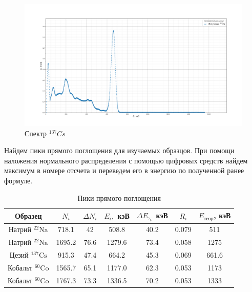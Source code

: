 \documentclass[a4paper,12pt]{article} %
\begin{document}
	\begin{figure}[H]
		\centering
		\includegraphics[width=0.95\linewidth]{Cs_137}
		\caption{Спектр $^{137}Cs$}
		\label{fig:cs137}
	\end{figure}
	Найдем пики прямого поглощения для изучаемых образцов. При помощи наложения нормального распределения с помощью цифровых средств найдем максимум в номере отсчета и переведем его в энергию по полученной ранее формуле.
	\begin{table}[H]
		\caption{Пики прямого поглощения}
		\begin{center}
			\begin{tabular}{|c|c|c|c|c|c|c|}
				\hline 
				Образец & $N_i $ & $ \Delta N_i $ & $ E_i, $ кэВ & $ \Delta E,_i $ кэВ  & $ R_i $ & $E_{\text{теор}}$, кэВ\\ 
				\hline 
				Натрий $ \mathrm{^{22}Na} $ & 718.1 & 42 & 508.8 & 40.2 & 0.079 & 511\\
				Натрий $ \mathrm{^{22}Na} $& 1695.2 & 76.6 & 1279.6 & 73.4 & 0.058 & 1275 \\
				Цезий $ \mathrm{^{137}Cs} $ & 915.3 & 47.4 & 664.2 & 45.3 & 0.069 & 661.6 \\
				Кобальт $ \mathrm{^{60}Co} $ & 1565.7 & 65.1 & 1177.0 & 62.3 & 0.053 & 1173\\
				Кобальт $ \mathrm{^{60}Co} $ & 1767.3 & 73.3 & 1336.5 & 70.2 & 0.053 & 1333 \\
				
				
				\hline 
			\end{tabular} 
		\end{center}
		\label{res}
	\end{table}
\end{document}
